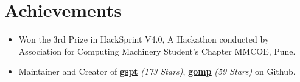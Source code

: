 \documentclass[letterpaper,11pt]{article}
\begin{document}
\section{Achievements}

\begin{itemize}
    \item Won the 3rd Prize in HackSprint V4.0, A Hackathon conducted by Association for Computing Machinery Student’s
Chapter MMCOE, Pune.
    \item Maintainer and Creator of \href{https://github.com/aditya-K2/gspt}{\underline{\textbf{gspt}}} \textit{(173 Stars)}, \href{https://github.com/aditya-K2/gomp}{\underline{\textbf{gomp}}} \textit{(59 Stars)} on Github.
\end{itemize}
\end{document}
